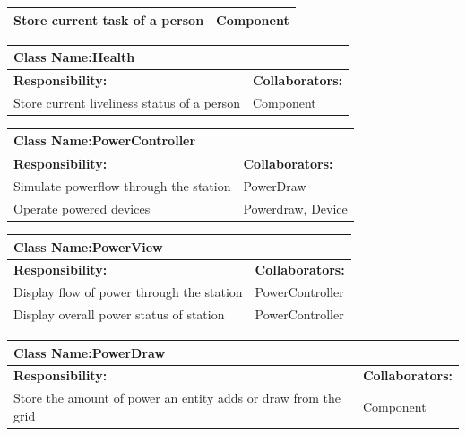 \documentclass[]{article}
\begin{document}
\begin{enumerate}[a)]
\begin{table}[ht]
\begin{tabular}{|p{5cm}|p{5cm}|}
		Store current task of a person & Component \\
		\hline
		\end{tabular}	
	\end{table}
	\begin{table}[ht]
		\centering
		\begin{tabular}{|p{5cm}|p{5cm}|}
		\hline 
		 \multicolumn{2}{|l|}{\textbf{Class Name:}Health} \\
		\hline
		\textbf{Responsibility:} & \textbf{Collaborators:} \\
		\hline 
		Store current liveliness status of a person & Component \\
		\hline
		\end{tabular}	
	\end{table}
	\begin{table}[ht]
		\centering
		\begin{tabular}{|p{5cm}|p{5cm}|}
		\hline 
		 \multicolumn{2}{|l|}{\textbf{Class Name:}PowerController} \\
		\hline
		\textbf{Responsibility:} & \textbf{Collaborators:} \\
		\hline 
		Simulate powerflow through the station & PowerDraw \\
		\hline
		Operate powered devices & Powerdraw, Device \\
		\hline
		\end{tabular}	
	\end{table}
	\begin{table}[ht]
		\centering
		\begin{tabular}{|p{5cm}|p{5cm}|}
		\hline 
		 \multicolumn{2}{|l|}{\textbf{Class Name:}PowerView} \\
		\hline
		\textbf{Responsibility:} & \textbf{Collaborators:} \\
		\hline 
		Display flow of power through the station &  PowerController\\
		\hline
		Display overall power status of station &  PowerController\\
		\hline
		\end{tabular}
	\end{table}
	\begin{table}[ht]
		\centering
		\begin{tabular}{|p{5cm}|p{5cm}|}
		\hline 
		 \multicolumn{2}{|l|}{\textbf{Class Name:}PowerDraw} \\
		\hline
		\textbf{Responsibility:} & \textbf{Collaborators:} \\
		\hline 
		Store the amount of power an entity adds or draw from the grid & Component\\

\end{tabular}
\end{table}
\end{enumerate}
\end{document}
